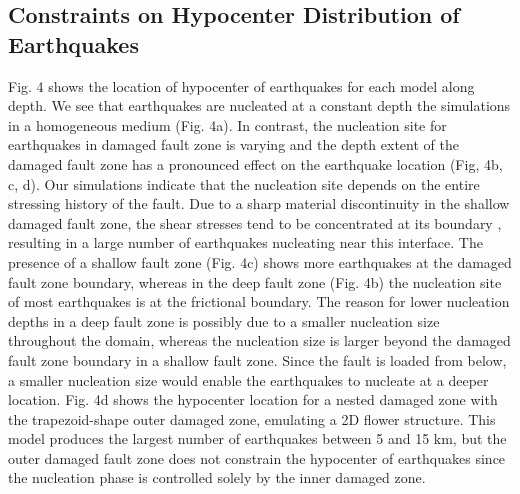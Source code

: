 \documentclass[11pt]{article}
\begin{document}
\subsection{Constraints on Hypocenter Distribution of Earthquakes}
Fig. 4 shows the location of hypocenter of earthquakes for each model along depth. We see that earthquakes are nucleated at a constant depth the simulations in a homogeneous medium (Fig. 4a). In contrast, the nucleation site for earthquakes in damaged fault zone is varying and the depth extent of the damaged fault zone has a pronounced effect on the earthquake location (Fig, 4b, c, d). Our simulations indicate that the nucleation site depends on the entire stressing history of the fault. Due to a sharp material discontinuity in the shallow damaged fault zone, the shear stresses tend to be concentrated at its boundary \citep{bonafede_2002, rybicki_2002}, resulting in a large number of earthquakes nucleating near this interface. The presence of a shallow fault zone (Fig. 4c) shows more earthquakes at the damaged fault zone boundary, whereas in the deep fault zone (Fig. 4b) the nucleation site of most earthquakes is at the frictional boundary. The reason for lower nucleation depths in a deep fault zone is possibly due to a smaller nucleation size throughout the domain, whereas the nucleation size is larger beyond the damaged fault zone boundary in a shallow fault zone. Since the fault is loaded from below, a smaller nucleation size would enable the earthquakes to nucleate at a deeper location. Fig. 4d shows the hypocenter location for a nested damaged zone with the trapezoid-shape outer damaged zone, emulating a 2D flower structure. This model produces the largest number of earthquakes between 5 and 15 km, but the outer damaged fault zone does not constrain the hypocenter of earthquakes since the nucleation phase is controlled solely by the inner damaged zone.
\end{document}
